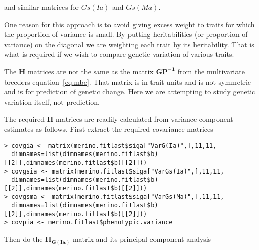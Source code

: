 \documentclass[titlepage]{article}  %
\begin{document}
and similar matrices for $Gs(Ia)$ and $Gs(Ma)$.

One reason for this approach is to avoid giving excess weight to traits for which the proportion of variance is small. By putting heritabilities (or proportion of variance) on the diagonal we are weighting each trait by its heritability. That is what is required if we wish to compare genetic variation of various traits.

The $\bm{H}$ matrices are not the same as the matrix $\bm{GP^{-1}}$ from the multivariate breeders equation~\ref{eq.mbe}. That matrix is in trait units and is not symmetric and is for prediction of genetic change. Here we are attempting to study genetic variation itself, not prediction.

The required $\bm{H}$ matrices are readily calculated from variance component estimates as follows. First extract the required covariance matrices

\begin{verbatim}
> covgia <- matrix(merino.fitlast$siga["VarG(Ia)",],11,11,
  dimnames=list(dimnames(merino.fitlast$b)[[2]],dimnames(merino.fitlast$b)[[2]]))
> covgsia <- matrix(merino.fitlast$siga["VarGs(Ia)",],11,11,
  dimnames=list(dimnames(merino.fitlast$b)[[2]],dimnames(merino.fitlast$b)[[2]]))
> covgsma <- matrix(merino.fitlast$siga["VarGs(Ma)",],11,11,
  dimnames=list(dimnames(merino.fitlast$b)[[2]],dimnames(merino.fitlast$b)[[2]]))
> covpia <- merino.fitlast$phenotypic.variance
\end{verbatim}

Then do the $\bm{H_{G(Ia)}}$ matrix and its principal component analysis
\end{document}
